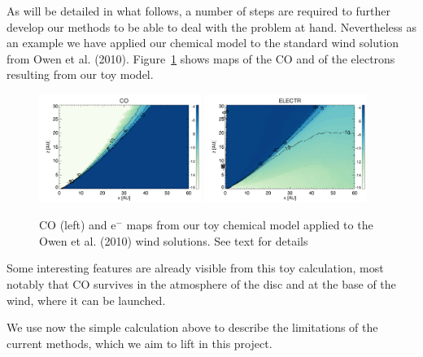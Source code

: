 \documentclass[10pt,fleqn,twoside]{article}
\begin{document}
As will be detailed in what follows, a number of steps are required to
further develop our methods to be able to deal with the problem at
hand. Nevertheless as an example we have applied our chemical model to
the standard wind solution from Owen et
al. (2010). Figure~\ref{fig:chem} shows maps of the CO and of the
electrons resulting from our toy model. 

 \begin{figure}
   \centering
   \includegraphics[width=0.47\textwidth]{Lx_2e29_CO.pdf}
   \includegraphics[width=0.47\textwidth]{Lx_2e29_ELECTR.pdf}
   \caption{CO (left) and e$^-$ maps from our toy chemical model
     applied to the Owen et al. (2010) wind solutions. See text for details
}
              \label{fig:chem}%
    \end{figure}

Some interesting features are already visible from this toy
calculation, most notably that CO survives in the atmosphere of the
disc and at the base of the wind, where it can be launched. 

We use now the simple calculation above to describe the limitations of
the current methods, which we aim to lift in this project. 
\end{document}
